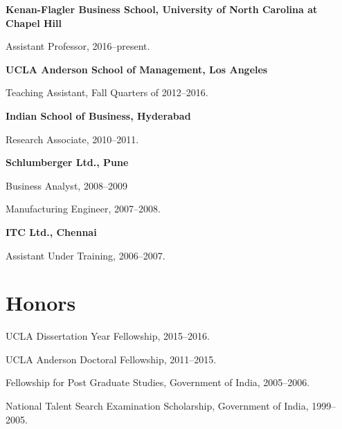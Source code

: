 \documentclass[11pt,a4paper]{article}
\renewenvironment{itemize}{
	\begin{list}{}{
			\setlength{\leftmargin}{1.5em}
		}
	}{
\end{list}
}
\begin{document}
	\begin{itemize}
		\item \textbf{Kenan-Flagler Business School, University of North Carolina at Chapel Hill}

		\begin{itemize}
			\item Assistant Professor, 2016--present.
		\end{itemize}
		\item \textbf{UCLA Anderson School of Management, Los Angeles}

		\begin{itemize}
			\item Teaching Assistant, Fall Quarters of 2012--2016.
		\end{itemize}

		\item \textbf{Indian School of Business, Hyderabad}

		\begin{itemize}
			\item Research Associate, 2010--2011.
		\end{itemize}


		\item \textbf{Schlumberger Ltd., Pune}
		\begin{itemize}
			\item Business Analyst,  2008--2009
			\item Manufacturing Engineer, 2007--2008.
		\end{itemize}
		\item \textbf{ITC Ltd., Chennai}

		\begin{itemize}
			\item Assistant Under Training, 2006--2007.
		\end{itemize}

	\end{itemize}

	\section*{\textbf{Honors}}

	\begin{itemize}
		\item UCLA Dissertation Year Fellowship, 2015--2016.
		\item UCLA Anderson Doctoral Fellowship, 2011--2015.
		\item Fellowship for Post Graduate Studies, Government of India,  2005--2006.
		\item National Talent Search Examination Scholarship, Government of India, 1999--2005.
	\end{itemize}
\end{document}
